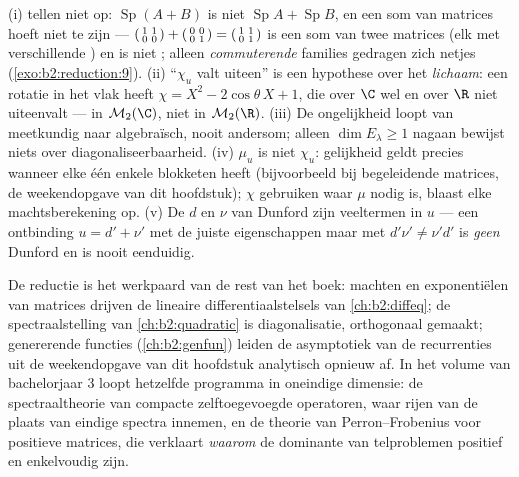 \begin{remark}\label{rem:b2:reduction:pitfalls}
(i)  tellen niet op: $\operatorname{Sp}(A + B)$ is niet
$\operatorname{Sp}A + \operatorname{Sp}B$, en een som van
 matrices hoeft niet  te zijn ---
$\begin{psmallmatrix}1 & 1\\ 0 & 0\end{psmallmatrix} +
\begin{psmallmatrix}0 & 0\\ 0 & 1\end{psmallmatrix} =
\begin{psmallmatrix}1 & 1\\ 0 & 1\end{psmallmatrix}$ is een som van
twee  matrices (elk met verschillende
) en is niet ; alleen
\emph{commuterende} families gedragen zich netjes
(\cref{exo:b2:reduction:9}). (ii) ``$\chi_u$ valt uiteen'' is een
hypothese over het \emph{lichaam}: een rotatie in het vlak heeft
$\chi = X^2 - 2\cos\theta\,X + 1$, die over $\C$ wel en over $\R$
niet uiteenvalt ---  in $\mathcal{M}_2(\C)$, niet
 in $\mathcal{M}_2(\R)$. (iii) De ongelijkheid
loopt van meetkundig naar algebraïsch, nooit andersom; alleen
$\dim E_\lambda \geq 1$ nagaan bewijst niets over
diagonaliseerbaarheid. (iv) $\mu_u$ is niet $\chi_u$: gelijkheid
geldt precies wanneer elke  één enkele blokketen heeft
(bijvoorbeeld bij begeleidende matrices, de weekendopgave van dit
hoofdstuk); $\chi$ gebruiken waar $\mu$ nodig is, blaast elke
machtsberekening op. (v) De $d$ en $\nu$ van Dunford zijn
veeltermen in $u$ --- een ontbinding $u = d' + \nu'$ met de juiste
eigenschappen maar met $d'\nu' \neq \nu'd'$ is \emph{geen} Dunford
en is nooit eenduidig.
\end{remark}

\begin{remark}
De reductie is het werkpaard van de rest van het boek: machten en
exponentiëlen van matrices drijven de lineaire
differentiaalstelsels van \cref{ch:b2:diffeq}; de spectraalstelling
van \cref{ch:b2:quadratic} is diagonalisatie, orthogonaal gemaakt;
genererende functies (\cref{ch:b2:genfun}) leiden de asymptotiek
van de recurrenties uit de weekendopgave van dit hoofdstuk
analytisch opnieuw af. In het volume van bachelorjaar 3 loopt
hetzelfde programma in oneindige dimensie: de spectraaltheorie van
compacte zelftoegevoegde operatoren, waar rijen van  de
plaats van eindige spectra innemen, en de theorie van
Perron--Frobenius voor positieve matrices, die verklaart
\emph{waarom} de dominante  van telproblemen positief
en enkelvoudig zijn.
\end{remark}

